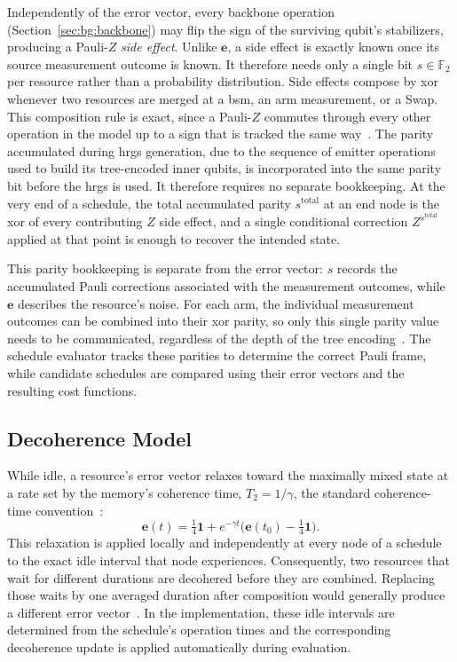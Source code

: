Independently of the error vector, every backbone operation (Section~\ref{sec:bg:backbone}) may flip the sign of the surviving qubit's stabilizers, producing a Pauli-$Z$ \emph{side effect}. Unlike $\mathbf{e}$, a side effect is exactly known once its source measurement outcome is known. It therefore needs only a single bit $s\in\mathbb{F}_2$ per resource rather than a probability distribution. Side effects compose by \gls{xor} whenever two resources are merged at a \Gls{bsm}, an arm measurement, or a Swap. This composition rule is exact, since a Pauli-$Z$ commutes through every other operation in the model up to a sign that is tracked the same way~\cite{Benchasattabuse2026Bridging}. The parity accumulated during \Gls{hrgs} generation, due to the sequence of emitter operations used to build its tree-encoded inner qubits, is incorporated into the same parity bit before the \Gls{hrgs} is used. It therefore requires no separate bookkeeping. At the very end of a schedule, the total accumulated parity $s^{\mathrm{total}}$ at an end node is the \Gls{xor} of every contributing $Z$ side effect, and a single conditional correction $Z^{s^{\mathrm{total}}}$ applied at that point is enough to recover the intended state.

This parity bookkeeping is separate from the error vector: $s$ records the accumulated Pauli corrections associated with the measurement outcomes, while $\mathbf{e}$ describes the resource's noise. For each arm, the individual measurement outcomes can be combined into their \Gls{xor} parity, so only this single parity value needs to be communicated, regardless of the depth of the tree encoding~\cite{Benchasattabuse2026Bridging}. The schedule evaluator tracks these parities to determine the correct Pauli frame, while candidate schedules are compared using their error vectors and the resulting cost functions.

\subsection{Decoherence Model}
\label{sec:bg:decoherence}

While idle, a resource's error vector relaxes toward the maximally mixed state at a rate set by the memory's coherence time, $T_2 = 1/\gamma$, the standard coherence-time convention~\cite{Nielsen2010Quantum}:
\[
    \mathbf{e}(t) = \tfrac{1}{4}\mathbf{1} +
    e^{-\gamma t}\bigl(\mathbf{e}(t_0) - \tfrac{1}{4}\mathbf{1}\bigr).
\]
This relaxation is applied locally and independently at every node of a schedule to the exact idle interval that node experiences. Consequently, two resources that wait for different durations are decohered before they are combined. Replacing those waits by one averaged duration after composition would generally produce a different error vector~\cite{Benchasattabuse2025Integrating,Benchasattabuse2026Bridging}. In the implementation, these idle intervals are determined from the schedule's operation times and the corresponding decoherence update is applied automatically during evaluation.

